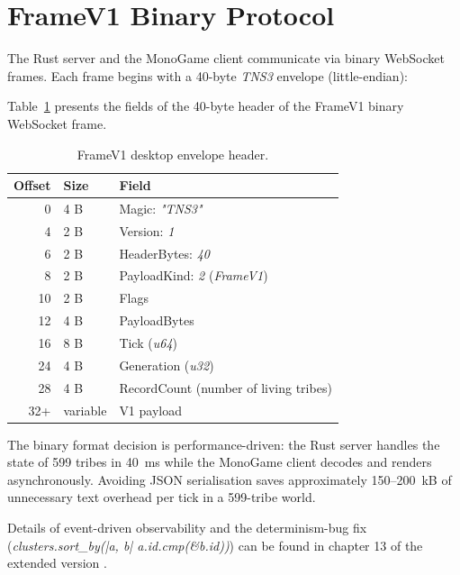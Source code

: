 \section{FrameV1 Binary Protocol}

The Rust server and the MonoGame client communicate via binary WebSocket frames. Each frame begins with a 40-byte \textit{TNS3} envelope (little-endian):

Table~\ref{tab:framev1-envelope} presents the fields of the 40-byte header of the FrameV1 binary WebSocket frame.

\begin{table}[H]
\centering
\caption{FrameV1 desktop envelope header.}
\label{tab:framev1-envelope}
\begin{tabular}{|r|l|l|}
\hline
\textbf{Offset} & \textbf{Size} & \textbf{Field} \\
\hline
0  & 4 B & Magic: \textit{"TNS3"} \\
4  & 2 B & Version: \textit{1} \\
6  & 2 B & HeaderBytes: \textit{40} \\
8  & 2 B & PayloadKind: \textit{2} (\textit{FrameV1}) \\
10 & 2 B & Flags \\
12 & 4 B & PayloadBytes \\
16 & 8 B & Tick (\textit{u64}) \\
24 & 4 B & Generation (\textit{u32}) \\
28 & 4 B & RecordCount (number of living tribes) \\
32+ & variable & V1 payload \\
\hline
\end{tabular}
\end{table}

The binary format decision is performance-driven: the Rust server handles the state of 599 tribes in 40~ms while the MonoGame client decodes and renders asynchronously. Avoiding JSON serialisation saves approximately 150--200~kB of unnecessary text overhead per tick in a 599-tribe world.

Details of event-driven observability and the determinism-bug fix (\textit{clusters.sort\_by(|a, b| a.id.cmp(\&b.id))}) can be found in chapter 13 of the extended version \cite{premadegraph-full}.
